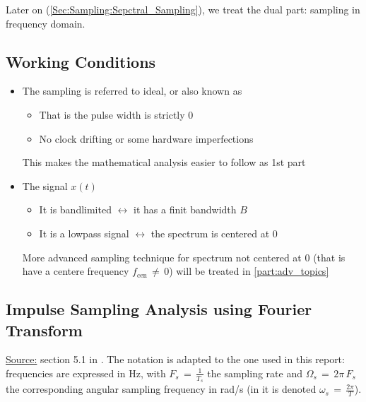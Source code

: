 Later on (\ref{Sec:Sampling:Sepctral_Sampling}), we treat the dual part: sampling in frequency domain.


\subsection{Working Conditions}

\begin{itemize}

\item The sampling is referred to ideal, or also known as 

	\begin{itemize}
	\item That is the pulse width is strictly 0
	
	\item No clock drifting or some hardware imperfections
	\end{itemize}
	
This makes the mathematical analysis easier to follow as 1st part

\item The signal $x(t)$

	\begin{itemize}
	\item It is bandlimited $\leftrightarrow$ it has a finit bandwidth $B$
	
	\item It is a lowpass signal $\leftrightarrow$ the spectrum is centered at 0
	\end{itemize}

More advanced sampling technique for spectrum not centered at 0 (that is have a centere frequency $f_{\text{cen}} \, \neq \, 0$) will be treated in \autoref{part:adv_topics}

\end{itemize}

\newpage
\subsection{Impulse Sampling Analysis using Fourier Transform}

\underline{Source:} section 5.1 in \cite{signal_processing_Lathi}. The notation is adapted to the one used in this report: frequencies are expressed in Hz, with $F_s \, = \, \displaystyle\frac{1}{T_s}$ the sampling rate and $\Omega_s \, = \, 2 \pi \, F_s$ the corresponding angular sampling frequency in rad/s (in \cite{signal_processing_Lathi} it is denoted $\omega_s \, = \, \displaystyle\frac{2\pi}{T}$).\\

